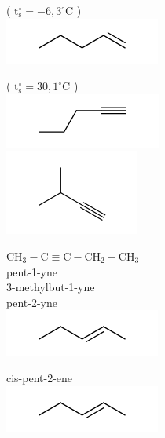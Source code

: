 \documentclass[10pt]{article}
\begin{document}
( $\mathrm{t}_{\mathrm{s}}^{\circ}=-6,3^{\circ} \mathrm{C}$ )\\
\includegraphics{smile-c3115ddee60253494ddd35759bfd70d44884c617}

( $\mathrm{t}_{\mathrm{s}}^{\circ}=30,1^{\circ} \mathrm{C}$ )\\
\includegraphics{smile-aa2fb3686c6ca48d6ae80cd0f28cc64cce4b3c1d}\\
\includegraphics{smile-6b3c2e17e230e6042c143ff5fc405196386f85b2}

$\mathrm{CH}_{3}-\mathrm{C} \equiv \mathrm{C}-\mathrm{CH}_{2}-\mathrm{CH}_{3}$\\
pent-1-yne\\
3-methylbut-1-yne\\
pent-2-yne\\
\includegraphics{smile-563646fc6a81bb37c8014c19555cfdd090946ac3}

cis-pent-2-ene\\
\includegraphics{smile-ac1916a6bb0e8767647d2c4030993449b466cc9a}
\end{document}
